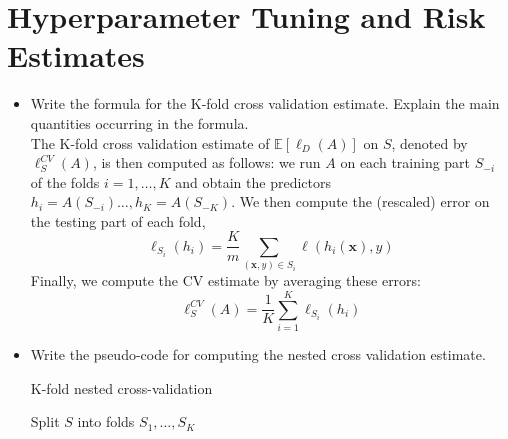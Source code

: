 \newpage
\section{Hyperparameter Tuning and Risk Estimates}

\begin{itemize}
    \item Write the formula for the K-fold cross validation estimate. Explain the main quantities occurring in the formula.\\

        The K-fold cross validation estimate of $\mathbb{E}[\ell_{D}(A)]$ on $S$, denoted by $\ell_{S}^{CV}(A)$, is then computed as follows: we run $A$ on each training part $S_{-i}$ of the folds $i = 1, \dots, K$ and obtain the predictors $h_i = A(S_{-i}) \dots, h_K = A(S_{-K})$. We then compute the (rescaled) error on the testing part of each fold,
        $$
        \ell_{S_{i}}(h_i) = \frac{K}{m} \sum_{(\boldsymbol{x},y) \in S_{i}} \ell(h_i(\boldsymbol{x}), y)
        $$
        Finally, we compute the CV estimate by averaging these errors:
        $$
        \ell_{S}^{CV}(A) = \frac{1}{K} \sum_{i=1}^{K} \ell_{S_{i}}(h_i)
        $$

    \item Write the pseudo-code for computing the nested cross validation estimate.\\

        \begin{algorithm}[H]
            \SetAlgoLined
            \DontPrintSemicolon
            \caption{K-fold nested cross-validation}
            Split $S$ into folds $S_1, \dots, S_K$\\
        \end{algorithm}

\end{itemize}
